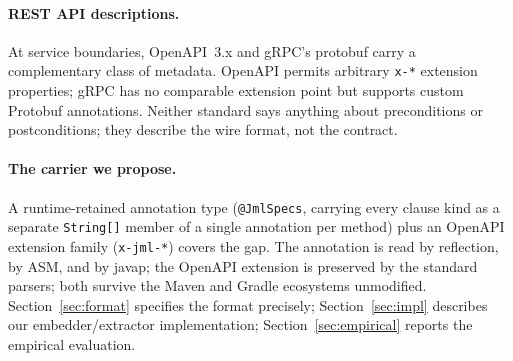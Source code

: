 \paragraph{REST API descriptions.}
At service boundaries, OpenAPI~3.x and gRPC's protobuf carry a complementary class of metadata. OpenAPI permits arbitrary \texttt{x-*} extension properties; gRPC has no comparable extension point but supports custom Protobuf annotations. Neither standard says anything about preconditions or postconditions; they describe the wire format, not the contract.

\paragraph{The carrier we propose.}
A runtime-retained annotation type (\texttt{@JmlSpecs}, carrying every clause kind as a separate \texttt{String[]} member of a single annotation per method) plus an OpenAPI extension family (\texttt{x-jml-*}) covers the gap. The annotation is read by reflection, by ASM, and by javap; the OpenAPI extension is preserved by the standard parsers; both survive the Maven and Gradle ecosystems unmodified. Section~\ref{sec:format} specifies the format precisely; Section~\ref{sec:impl} describes our embedder/extractor implementation; Section~\ref{sec:empirical} reports the empirical evaluation.
